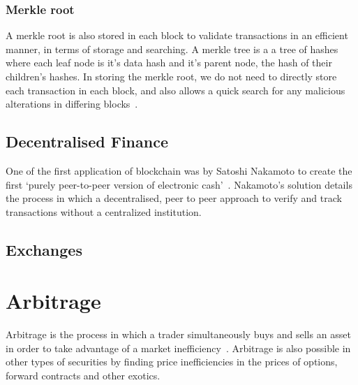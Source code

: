 \subsubsection{Merkle root}
A merkle root is also stored in each block to validate transactions in an efficient manner, in terms of storage and searching. A merkle tree is a a tree of hashes where each leaf node is it's data hash and it's parent node, the hash of their children's hashes. In storing the merkle root, we do not need to directly store each transaction in each block, and also allows a quick search for any malicious alterations in differing blocks~\cite{noauthor_merkle_nodate}.

\subsection{Decentralised Finance}
One of the first application of blockchain was by Satoshi Nakamoto to create the first `purely peer-to-peer version of electronic cash'~\cite{nakamoto2009bitcoin}. Nakamoto's solution details the process in which a decentralised, peer to peer approach to verify and track transactions without a centralized institution.

\subsection{Exchanges}

\section{Arbitrage}
Arbitrage is the process in which a trader simultaneously buys and sells an asset in order to take advantage of a market inefficiency~\cite{businessinsightsblog_2021}. Arbitrage is also possible in other types of securities by finding price inefficiencies in the prices of options, forward contracts and other exotics.


